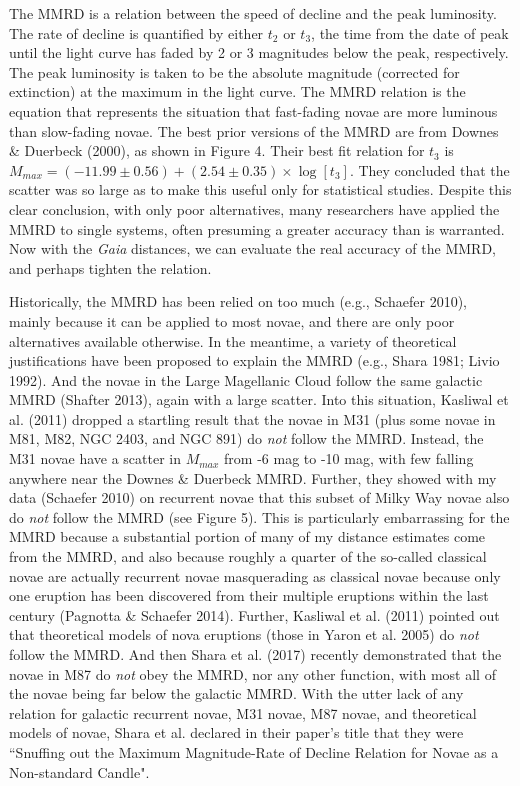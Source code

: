 \documentclass[a4paper,fleqn,usenatbib]{mnras}
\begin{document}
The MMRD is a relation between the speed of decline and the peak luminosity.  The rate of decline is quantified by either $t_2$ or $t_3$, the time from the date of peak until the light curve has faded by 2 or 3 magnitudes below the peak, respectively.  The peak luminosity is taken to be the absolute magnitude (corrected for extinction) at the maximum in the light curve.  The MMRD relation is the equation that represents the situation that fast-fading novae are more luminous than slow-fading novae.  The best prior versions of the MMRD are from Downes \& Duerbeck (2000), as shown in Figure 4.  Their best fit relation for $t_3$ is $M_{max} = (-11.99 \pm 0.56) + (2.54 \pm 0.35)\times \log [t_3]$.  They concluded that the scatter was so large as to make this useful only for statistical studies.  Despite this clear conclusion, with only poor alternatives, many researchers have applied the MMRD to single systems, often presuming a greater accuracy than is warranted.  Now with the {\it Gaia} distances, we can evaluate the real accuracy of the MMRD, and perhaps tighten the relation.

Historically, the MMRD has been relied on too much (e.g., Schaefer 2010), mainly because it can be applied to most novae, and there are only poor alternatives available otherwise.  In the meantime, a variety of theoretical justifications have been proposed to explain the MMRD (e.g., Shara 1981; Livio 1992).  And the novae in the Large Magellanic Cloud follow the same galactic MMRD (Shafter 2013), again with a large scatter.  Into this situation, Kasliwal et al. (2011) dropped a startling result that the novae in M31 (plus some novae in M81, M82, NGC 2403, and NGC 891) do {\it not} follow the MMRD.  Instead, the M31 novae have a scatter in $M_{max}$ from -6 mag to -10 mag, with few falling anywhere near the Downes \& Duerbeck MMRD.  Further, they showed with my data (Schaefer 2010) on recurrent novae that this subset of Milky Way novae also do {\it not} follow the MMRD (see Figure 5).  This is particularly embarrassing for the MMRD because a substantial portion of many of my distance estimates come from the MMRD, and also because roughly a quarter of the so-called classical novae are actually recurrent novae masquerading as classical novae because only one eruption has been discovered from their multiple eruptions within the last century (Pagnotta \& Schaefer 2014).  Further, Kasliwal et al. (2011) pointed out that theoretical models of nova eruptions (those in Yaron et al. 2005) do {\it not} follow the MMRD.  And then Shara et al. (2017) recently demonstrated that the novae in M87 do {\it not} obey the MMRD, nor any other function, with most all of the novae being far below the galactic MMRD.  With the utter lack of any relation for galactic recurrent novae, M31 novae, M87 novae, and theoretical models of novae, Shara et al. declared in their paper's title that they were ``Snuffing out the Maximum Magnitude-Rate of Decline Relation for Novae as a Non-standard Candle". 
\end{document}

